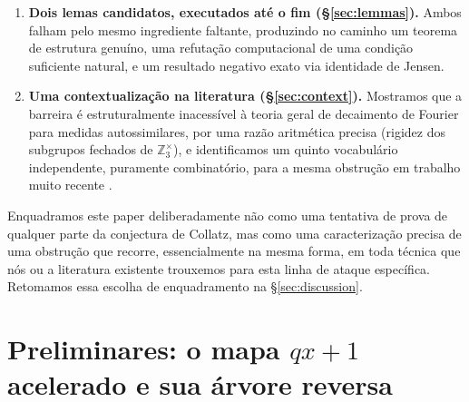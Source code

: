 \documentclass[11pt]{article}
\theoremstyle{definition}
\theoremstyle{remark}
\begin{document}
\begin{enumerate}[label=(\roman*)]
{  bivariada de Tao (\S\ref{sec:regimes}), e triangulação com duas
  outras formulações independentes da mesma obstrução
  (\S\ref{sec:triangulation}).}
\item \textbf{Dois lemas candidatos, executados até o fim
  (\S\ref{sec:lemmas}).} Ambos falham pelo mesmo ingrediente faltante,
  produzindo no caminho um teorema de estrutura genuíno, uma refutação
  computacional de uma condição suficiente natural, e um resultado
  negativo exato via identidade de Jensen.
\item \textbf{Uma contextualização na literatura (\S\ref{sec:context}).}
  Mostramos que a barreira é estruturalmente inacessível à teoria geral
  de decaimento de Fourier para medidas autossimilares, por uma razão
  aritmética precisa (rigidez dos subgrupos fechados de
  $\mathbb{Z}_3^\times$), e identificamos um quinto vocabulário
  independente, puramente combinatório, para a mesma obstrução em
  trabalho muito recente \cite{Chang2026}.
\end{enumerate}

Enquadramos este paper deliberadamente não como uma tentativa de prova
de qualquer parte da conjectura de Collatz, mas como uma caracterização
precisa de uma obstrução que recorre, essencialmente na mesma forma,
em toda técnica que nós ou a literatura existente trouxemos para esta
linha de ataque específica. Retomamos essa escolha de enquadramento na
\S\ref{sec:discussion}.

\section{Preliminares: o mapa $qx+1$ acelerado e sua árvore reversa}
\label{sec:setup}
\end{document}
